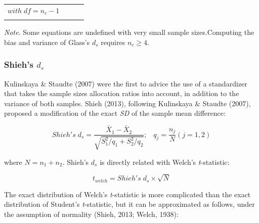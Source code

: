 \documentclass[
  man,floatsintext]{apa6}
\begin{document}
\begin{landscape}
\begin{longtable}[]{@{}lccc@{}}
\begin{minipage}[t]{0.48\columnwidth}
\tiny\(with \; df =n_c-1\)\strut
\end{minipage}\tabularnewline
\begin{minipage}[t]{0.06\columnwidth}\raggedright
\strut
\end{minipage} & \begin{minipage}[t]{0.15\columnwidth}\centering
\strut
\end{minipage} & \begin{minipage}[t]{0.19\columnwidth}\centering
\strut
\end{minipage} & \begin{minipage}[t]{0.48\columnwidth}\centering
\strut
\end{minipage}\tabularnewline
\bottomrule
\end{longtable}

\emph{Note}. Some equations are undefined with very small sample sizes.Computing the bias and variance of Glass's \(d_s\) requires \(n_c \ge 4\).

\end{landscape}
\newpage

\hypertarget{shiehs-d_s}{%
\subsubsection{\texorpdfstring{Shieh's \(d_s\)}{Shieh's d\_s}}\label{shiehs-d_s}}

Kulinskaya \& Staudte (2007) were the first to advice the use of a standardizer that takes the sample sizes allocation ratios into account, in addition to the variance of both samples. Shieh (2013), following Kulinskaya \& Staudte (2007), proposed a modification of the exact \emph{SD} of the sample mean difference:

\begin{equation} 
Shieh's \; d_s = \frac{\bar{X}_1 - \bar{X}_2}{\sqrt{S_1^2/q_1+S_2^2/q_2}}; \;\;\; q_j=\frac{n_j}{N} (j=1,2)
\label{eq:Shiehds}
\end{equation}

where \(N = n_1+n_2\). Shieh's \(d_{s}\) is directly related with Welch's \emph{t}-statistic:

\begin{equation} 
t_{welch} = Shieh's \; d_s \times \sqrt{N}
\label{eq:shiehvswelch}
\end{equation}

The exact distribution of Welch's \emph{t}-statistic is more complicated than the exact distribution of Student's \emph{t}-statistic, but it can be approximated as follows, under the assumption of normality (Shieh, 2013; Welch, 1938):
\end{document}
